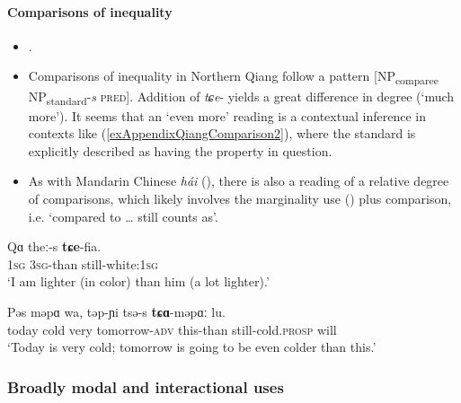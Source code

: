 \paragraph{Comparisons of inequality}\label{appendixQiangComparisons}
\begin{itemize}
	\item \textcite[213]{LaPollaHuang2003}.
	\item Comparisons of inequality in Northern Qiang follow a pattern [NP\textsubscript{comparee} \mbox{NP\textsubscript{standard}-\textit{s}} \textsc{pred}]. Addition of \mbox{\textit{tɕe}-} yields a great difference in degree (\lq much more\rq{}). It seems that an \lq even more\rq{ }reading is a contextual inference in contexts like (\ref{exAppendixQiangComparison2}), where the standard is explicitly described as having the property in question.
	\item As with Mandarin Chinese \textit{hái} (), there is also a reading of a relative degree of comparisons, which likely involves the marginality use () plus comparison, i.e. \lq compared to … still counts as\rq{}.
\end{itemize}

\begin{exe}
	\ex\label{exAppendixQiangComparison1}
	\gll Qɑ theː-s \textbf{tɕe}-fia.\\
	1\textsc{sg} 3\textsc{sg}-than still-white:1\textsc{sg}\\
	\glt \lq I am lighter (in color) than him (a lot lighter).\rq{ }\parencite[88]{LaPollaHuang2003}
	
	\ex\label{exAppendixQiangComparison2}
	\gll Pəs məpɑ wa, təp-ɲi tsə-s \textbf{tɕɑ}-məpɑː lu.\\
	today cold very tomorrow-\textsc{adv} this-than still-cold.\textsc{prosp} will\\
	\glt \lq Today is very cold; tomorrow is going to be even colder than this.'  \parencite[161]{LaPollaHuang2003}
\end{exe}

\subsubsection{Broadly modal and interactional uses}
